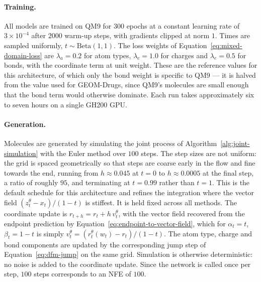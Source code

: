 \paragraph{Training.}
All models are trained on QM9 for $300$ epochs at a constant learning rate of $3\times 10^{-4}$
after $2000$ warm-up steps, with gradients clipped at norm $1$. Times are sampled uniformly,
$t \sim \mathrm{Beta}(1,1)$. The loss weights of Equation~\eqref{eq:mixed-domain-loss} are
$\lambda_a = 0.2$ for atom types, $\lambda_c = 1.0$ for charges and $\lambda_e = 0.5$ for bonds,
with the coordinate term at unit weight. These are the reference values for this architecture,
of which only the bond weight is specific to QM9 --- it is halved from the value used for
GEOM-Drugs, since QM9's molecules are small enough that the bond term would otherwise dominate.
Each run takes approximately six to seven hours on a single GH200 GPU.

\paragraph{Generation.}
Molecules are generated by simulating the joint process of Algorithm~\ref{alg:joint-simulation}
with the Euler method over $100$ steps. The step sizes are not uniform: the grid is spaced
geometrically so that steps are coarse early in the flow and fine towards the end, running from
$h \approx 0.045$ at $t = 0$ to $h \approx 0.0005$ at the final step, a ratio of roughly $95$, and
terminating at $t = 0.99$ rather than $t = 1$. This is the default schedule for this architecture
and refines the integration where the vector field $(z^\theta_t - x_t)/(1-t)$ is stiffest. It is
held fixed across all methods. The coordinate
update is $r_{t+h} = r_t + h\,v^\theta_t$, with the vector field recovered from the endpoint
prediction by Equation~\eqref{eq:endpoint-to-vector-field}, which for $\alpha_t = t$,
$\beta_t = 1-t$ is simply $v^\theta_t = (r^\theta_t(w_t) - r_t)/(1-t)$. The atom type, charge and
bond components are updated by the corresponding jump step of Equation~\eqref{eq:dfm-jump} on the
same grid. Simulation is otherwise deterministic: no noise is added to the coordinate update. Since
the network is called once per step, $100$ steps corresponds to an NFE of $100$.

